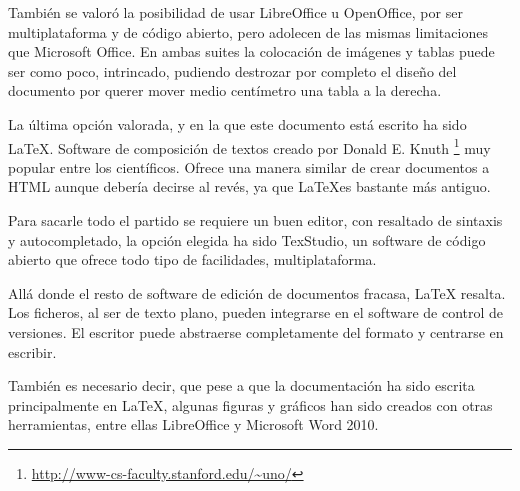 Tambi\'en se valor\'o la posibilidad de usar LibreOffice u OpenOffice, por ser 
multiplataforma y de c\'odigo abierto, pero adolecen
de las mismas limitaciones que Microsoft Office. 
En ambas suites la colocaci\'on de im\'agenes y tablas puede ser como poco,
intrincado, pudiendo destrozar por completo el dise\~no del documento por 
querer mover medio cent\'imetro una tabla a la
derecha.

La \'ultima opci\'on valorada, y en la que este documento est\'a escrito ha sido \LaTeX.
Software de composici\'{o}n de textos creado por Donald E. Knuth \footnote{\url{http://www-cs-faculty.stanford.edu/~uno/}} 
muy popular entre los cient\'{i}ficos. Ofrece una manera similar de crear documentos a HTML 
aunque deber\'{i}a decirse al rev\'{e}s, ya que \LaTeX es bastante m\'as antiguo.

Para sacarle todo el partido se requiere un buen editor, con resaltado de sintaxis y autocompletado, 
la opci\'on elegida ha sido TexStudio, un
software de c\'{o}digo abierto que ofrece todo tipo de facilidades, multiplataforma.

All\'a donde el resto de software de edici\'on de documentos 
fracasa, LaTeX resalta. Los ficheros, al ser de texto plano,
pueden integrarse en el software de control de versiones. El escritor puede abstraerse 
completamente del formato
y centrarse en escribir.

Tambi\'en es necesario decir, que pese a que la documentaci\'on ha sido escrita principalmente 
en LaTeX, algunas figuras
y gr\'aficos han sido creados con otras herramientas, entre ellas LibreOffice y Microsoft Word 
2010.
